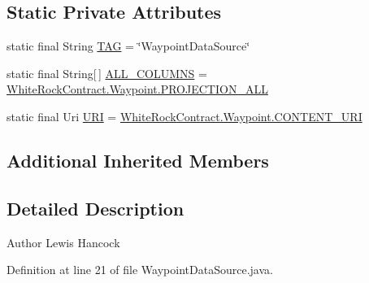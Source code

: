 \subsection*{Static Private Attributes}
\begin{DoxyCompactItemize}
\item 
static final String \hyperlink{classuk_1_1ac_1_1swan_1_1digitaltrails_1_1database_1_1_waypoint_data_source_a4b82f588a6a558a338e4b76bab35a256}{T\+A\+G} = \char`\"{}Waypoint\+Data\+Source\char`\"{}
\item 
static final String\mbox{[}$\,$\mbox{]} \hyperlink{classuk_1_1ac_1_1swan_1_1digitaltrails_1_1database_1_1_waypoint_data_source_a8b52fd1ffdc1ac59325a69927dbf201d}{A\+L\+L\+\_\+\+C\+O\+L\+U\+M\+N\+S} = \hyperlink{classuk_1_1ac_1_1swan_1_1digitaltrails_1_1database_1_1_white_rock_contract_1_1_waypoint_a25cdbc9a6b814bd5b8e73a479a169a89}{White\+Rock\+Contract.\+Waypoint.\+P\+R\+O\+J\+E\+C\+T\+I\+O\+N\+\_\+\+A\+L\+L}
\item 
static final Uri \hyperlink{classuk_1_1ac_1_1swan_1_1digitaltrails_1_1database_1_1_waypoint_data_source_a5f8ecac9d7b948c37264b81ed8995911}{U\+R\+I} = \hyperlink{classuk_1_1ac_1_1swan_1_1digitaltrails_1_1database_1_1_white_rock_contract_1_1_waypoint_a03d3daf433fe84895c9a47b9da814aff}{White\+Rock\+Contract.\+Waypoint.\+C\+O\+N\+T\+E\+N\+T\+\_\+\+U\+R\+I}
\end{DoxyCompactItemize}
\subsection*{Additional Inherited Members}


\subsection{Detailed Description}
\begin{DoxyAuthor}{Author}
Lewis Hancock 
\end{DoxyAuthor}


Definition at line 21 of file Waypoint\+Data\+Source.\+java.



